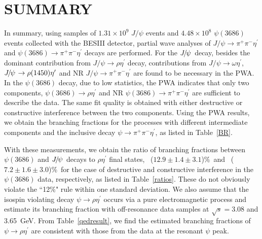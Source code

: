 \documentclass[twocolumn,showpacs,aps,prd]{revtex4-1}
\newcommand{\etap}{\eta^{\prime}}
\newcommand{\psip}{\psi(3686)}
\newcommand{\jpsiphsp}{J/\psi\rightarrow \pi^{+} \pi^{-}\etap}
\newcommand{\jpsirho}{J/\psi\rightarrow \rho \etap}
\newcommand{\jpsiomega}{J/\psi\rightarrow \omega \etap}
\newcommand{\psipphsp}{\psip\rightarrow\pi^{+} \pi^{-}\etap}
\newcommand{\ratiorhoI}  {$12.9\pm 1.4  \pm 3.1 $}
\newcommand{\ratiorhoII} {$7.2 \pm 1.6  \pm 3.0 $}
\begin{document}
\section{\boldmath SUMMARY}\label{summary}

In summary, using samples of $1.31\times 10^9$ $J/\psi$ events and $4.48\times 10^8$ $\psip$ events collected with the BESIII
detector, partial wave analyses of $J/\psi\to \pi^+\pi^-\eta^\prime$ and $\psip \to \pi^+\pi^-\eta^\prime$ decays are
performed.
For the ${J\mskip -3mu/\mskip -2mu\psi\mskip 2mu}$ decay, besides the dominant contribution from $\jpsirho$ decay, contributions from $\jpsiomega$, $\jpsi \to \rho(1450) \etap$ and NR $\jpsiphsp$ are found to be necessary in the PWA. In the $\psip$ decay, due to low statistics, the PWA indicates that only two components, $\psip \to \rho\etap$ and NR $\psipphsp$  are sufficient to describe the data. The same fit quality is obtained with either destructive or constructive interference between the two components. Using the PWA results,
we obtain the branching fractions for the processes with different intermediate components and the inclusive decay $\psi \to \pi^{+} \pi^{-} \etap$, as listed in Table~\ref{BR}.

With these measurements, we obtain the ratio of branching fractions between $\psip$ and ${J\mskip -3mu/\mskip -2mu\psi\mskip 2mu}$ decays to $\rho \etap$ final states, ~(\ratiorhoI)\%~and ~(\ratiorhoII)\%~for the case of destructive and constructive interference in the $\psip$ data, respectively, as listed in Table~\ref{ratios}. These do not obviously violate the ``12\%" rule within one standard deviation. We also assume that the isospin violating decay $\psi \to \rho \etap$ occurs via a pure electromagnetic process and estimate its branching fraction with off-resonance data samples at $\sqrt{s} = 3.08$ and 3.65~GeV. From Table~\ref{qedresult}, we find the estimated branching fractions of $\psi \to \rho \etap$ are consistent with those from the data at the resonant $\psi$ peak.





\end{document}
